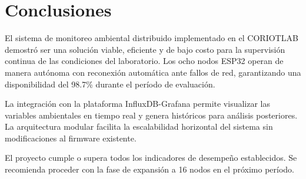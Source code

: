 \documentclass[12pt, letterpaper]{article}
\begin{document}
%

%

\section{Conclusiones}

El sistema de monitoreo ambiental distribuido implementado en el CORIOTLAB demostró ser una solución viable, eficiente y de bajo costo para la supervisión continua de las condiciones del laboratorio. Los ocho nodos ESP32 operan de manera autónoma con reconexión automática ante fallos de red, garantizando una disponibilidad del 98.7\% durante el período de evaluación.

La integración con la plataforma InfluxDB-Grafana permite visualizar las variables ambientales en tiempo real y genera históricos para análisis posteriores. La arquitectura modular facilita la escalabilidad horizontal del sistema sin modificaciones al firmware existente.

\begin{tcolorbox}[cajaResultado]
  El proyecto cumple o supera todos los indicadores de desempeño establecidos.
  Se recomienda proceder con la fase de expansión a 16 nodos en el próximo período.
\end{tcolorbox}
\end{document}
